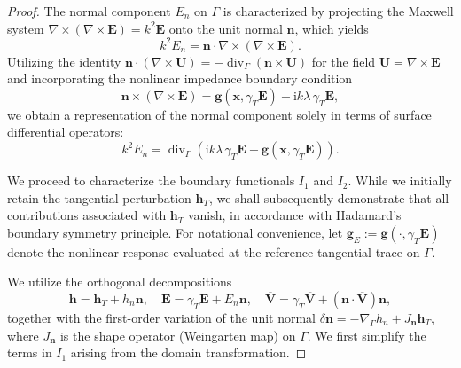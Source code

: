 \documentclass[12pt,reqno]{amsart}
\theoremstyle{definition}
\numberwithin{equation}{section}
\begin{document}
\begin{proof}
The normal component $E_n$ on $\Gamma$ is characterized by projecting the Maxwell system $\nabla \times (\nabla \times \mathbf{E}) = k^2 \mathbf{E}$ onto the unit normal $\mathbf{n}$, which yields
\[
k^2 E_n = \mathbf{n} \cdot \nabla \times (\nabla \times \mathbf{E}).
\]
Utilizing the identity $\mathbf{n} \cdot (\nabla \times \mathbf{U}) = -\operatorname{div}_\Gamma (\mathbf{n} \times \mathbf{U})$ for the field $\mathbf{U} = \nabla \times \mathbf{E}$ and incorporating the nonlinear impedance boundary condition
\[
\mathbf{n} \times (\nabla \times \mathbf{E}) = \mathbf{g}(\boldsymbol{x}, \gamma_T \mathbf{E}) - \mathrm{i} k \lambda \, \gamma_T \mathbf{E},
\]
we obtain a representation of the normal component solely in terms of surface differential operators:
\[
k^2 E_n = \operatorname{div}_\Gamma \left( \mathrm{i} k \lambda \, \gamma_T \mathbf{E} - \mathbf{g}(\boldsymbol{x}, \gamma_T \mathbf{E}) \right).
\]

We proceed to characterize the boundary functionals $I_1$ and $I_2$. While we initially retain the tangential perturbation $\mathbf{h}_T$, we shall subsequently demonstrate that all contributions associated with $\mathbf{h}_T$ vanish, in accordance with Hadamard's boundary symmetry principle. For notational convenience, let $\mathbf{g}_E := \mathbf{g}(\cdot, \gamma_T \mathbf{E})$ denote the nonlinear response evaluated at the reference tangential trace on $\Gamma$.

We utilize the orthogonal decompositions
\[
\mathbf{h} = \mathbf{h}_T + h_n \mathbf{n}, \quad \mathbf{E} = \gamma_T \mathbf{E} + E_n \mathbf{n}, \quad \overline{\mathbf{V}} = \gamma_T \overline{\mathbf{V}} + (\mathbf{n} \cdot \overline{\mathbf{V}}) \mathbf{n},
\]
together with the first-order variation of the unit normal $\delta \mathbf{n} = -\nabla_\Gamma h_n + J_{\mathbf{n}} \mathbf{h}_T$, where $J_{\mathbf{n}}$ is the shape operator (Weingarten map) on $\Gamma$. We first simplify the terms in $I_1$ arising from the domain transformation.


\end{proof}
\end{document}
